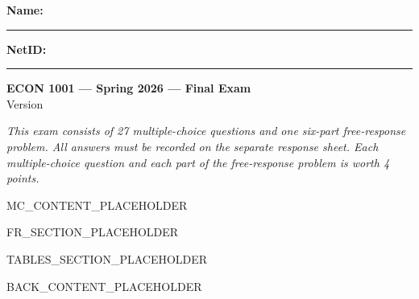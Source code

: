 \documentclass[12pt]{article}
\begin{document}
\pagestyle{fancy}
\fancyhf{}
\fancyfoot[C]{\thepage}
\renewcommand{\headrulewidth}{0pt} %
\renewcommand{\footrulewidth}{0pt} %
\thispagestyle{empty}

\noindent\textbf{Name:} \rule{3.5in}{0.4pt} \hfill \textbf{NetID:} \rule{1.8in}{0.4pt}

\begin{center}
  {\Large\textbf{ECON 1001 — Spring 2026 — Final Exam}}\\[0.2em]
  {\large Version }
\end{center}

\noindent\emph{This exam consists of 27 multiple-choice questions and one six-part free-response problem. All answers must be recorded on the separate response sheet. Each multiple-choice question and each part of the free-response problem is worth 4 points.}


\begin{questions}
  MC_CONTENT_PLACEHOLDER
\end{questions}

FR_SECTION_PLACEHOLDER

TABLES_SECTION_PLACEHOLDER

\newpage
BACK_CONTENT_PLACEHOLDER
\end{document}
